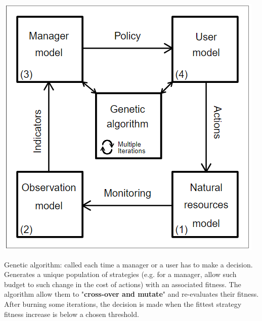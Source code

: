 \documentclass[12pt]{article}
\begin{document}
\begin{center}
\includegraphics[scale=0.5]{GMSE-diagram.PNG}
\end{center}

Genetic algorithm: called each time a manager or a user has to make a decision. Generates a unique population of strategies (e.g. for a manager, allow such budget to such change in the cost of actions) with an associated fitness. The algorithm allow them to "\textbf{cross-over and mutate}" and re-evaluates their fitness. After burning some iterations, the decision is made when the fittest strategy fitness increase is below a chosen threshold.\\
\end{document}
